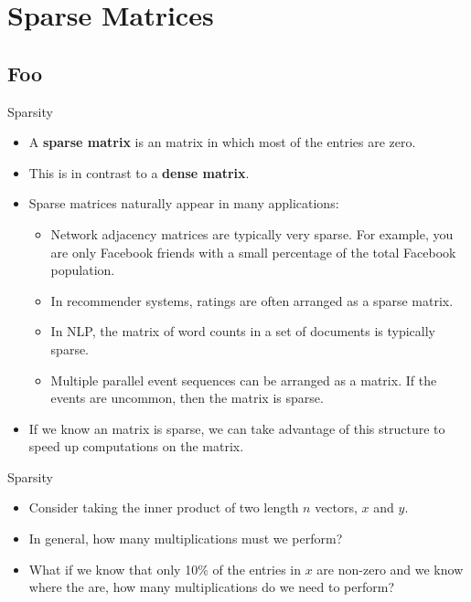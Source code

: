 \documentclass[serif,xcolor=pdftex,dvipsnames,table,hyperref={bookmarks=false,breaklinks}]{beamer}
\begin{document}
\maketitlepage

\section{Sparse Matrices}
\subsection{Foo}

\begin{frame}[t]{Sparsity}
	\begin{itemize}[<+->]
		\item A \textbf{sparse matrix} is an matrix in which most of the entries are zero. 
		\item This is in contrast to a \textbf{dense matrix}.
		\item Sparse matrices naturally appear in many applications:
		\begin{itemize}[<+->]
			\item Network adjacency matrices are typically very sparse. For example, you are only Facebook friends with a small percentage of the total Facebook population.
			\item In recommender systems, ratings are often arranged as a sparse matrix. 
			\item In NLP, the matrix of word counts in a set of documents is typically sparse.
			\item Multiple parallel event sequences can be arranged as a matrix. If the events are uncommon, then the matrix is sparse.
		\end{itemize}
		\item If we know an matrix is sparse, we can take advantage of this structure to speed up computations on the matrix.
	\end{itemize}
\end{frame}

\begin{frame}[t]{Sparsity}
	\begin{itemize}[<+->]
		\item Consider taking the inner product of two length $n$ vectors, $x$ and $y$.
		\item In general, how many multiplications must we perform?
		\item What if we know that only 10\% of the entries in $x$ are non-zero and we know where the are, how many multiplications do we need to perform?
	\end{itemize}
\end{frame}
\end{document}

